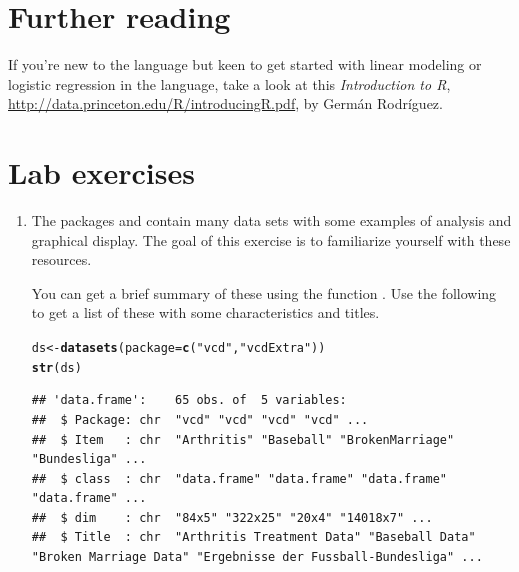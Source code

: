 \documentclass[11pt]{book}\usepackage[]{graphicx}\usepackage[]{color}
\makeatletter
\newcommand{\hlstr}[1]{\textcolor[rgb]{0.192,0.494,0.8}{#1}}%
\newcommand{\hlstd}[1]{\textcolor[rgb]{0.345,0.345,0.345}{#1}}%
\newcommand{\hlkwb}[1]{\textcolor[rgb]{0.69,0.353,0.396}{#1}}%
\newcommand{\hlkwc}[1]{\textcolor[rgb]{0.333,0.667,0.333}{#1}}%
\newcommand{\hlkwd}[1]{\textcolor[rgb]{0.737,0.353,0.396}{\textbf{#1}}}%
\newenvironment{kframe}{%
 \def\at@end@of@kframe{}%
 \ifinner\ifhmode%
  \def\at@end@of@kframe{\end{minipage}}%
  \begin{minipage}{\columnwidth}%
 \fi\fi%
 \def\FrameCommand##1{\hskip\@totalleftmargin \hskip-\fboxsep
 \colorbox{shadecolor}{##1}\hskip-\fboxsep
     \hskip-\linewidth \hskip-\@totalleftmargin \hskip\columnwidth}%
 \MakeFramed {\advance\hsize-\width
   \@totalleftmargin\z@ \linewidth\hsize
   \@setminipage}}%
 {\par\unskip\endMakeFramed%
 \at@end@of@kframe}
\newenvironment{knitrout}{}{} %
\renewenvironment{knitrout}{\small\renewcommand{\baselinestretch}{.85}}{} %
\makeatother
\begin{document}
\section{Further reading}\label{sec:ch02-reading}

If you're new to the \R language but keen to get started with linear modeling or logistic regression in the language, take a look at this \emph{Introduction to R},
\url{http://data.princeton.edu/R/introducingR.pdf},
by Germ\'an Rodríguez.

\section{Lab exercises}\label{sec:ch02-exercises}

\begin{enumerate}

\item The packages  and  contain many data sets with some
examples of analysis and graphical display.  The goal of this exercise is to
familiarize yourself with these resources.

You can get a brief summary of
these using the function .  Use the following to get a list of
these with some characteristics and titles.
\begin{knitrout}\footnotesize
{}\color{fgcolor}\begin{kframe}
\begin{alltt}
\hlstd{ds} \hlkwb{<-} \hlkwd{datasets}\hlstd{(}\hlkwc{package}\hlstd{=}\hlkwd{c}\hlstd{(}\hlstr{"vcd"}\hlstd{,} \hlstr{"vcdExtra"}\hlstd{))}
\hlkwd{str}\hlstd{(ds)}
\end{alltt}
\begin{verbatim}
## 'data.frame':	65 obs. of  5 variables:
##  $ Package: chr  "vcd" "vcd" "vcd" "vcd" ...
##  $ Item   : chr  "Arthritis" "Baseball" "BrokenMarriage" "Bundesliga" ...
##  $ class  : chr  "data.frame" "data.frame" "data.frame" "data.frame" ...
##  $ dim    : chr  "84x5" "322x25" "20x4" "14018x7" ...
##  $ Title  : chr  "Arthritis Treatment Data" "Baseball Data" "Broken Marriage Data" "Ergebnisse der Fussball-Bundesliga" ...
\end{verbatim}
\end{kframe}
\end{knitrout}



\end{enumerate}
\end{document}

